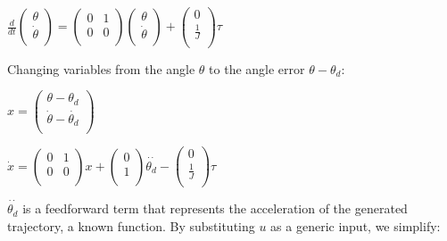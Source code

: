 \documentclass[11pt]{article}
\begin{document}
\begin{center}
\(\frac{d}{dt}\left(
\begin{array}{c}
 \theta  \\
 \dot{\theta } \\
\end{array}
\right)=\left(
\begin{array}{cc}
 0 & 1 \\
 0 & 0 \\
\end{array}
\right)\left(
\begin{array}{c}
 \theta  \\
 \dot{\theta } \\
\end{array}
\right)+\left(
\begin{array}{c}
 0 \\
 \frac{1}{J} \\
\end{array}
\right)\tau\)
\end{center}

Changing variables from the angle $\theta $ to the angle error \(\theta -\theta _d\):

\begin{center}
\(x=\left(
\begin{array}{c}
 \theta -\theta _d \\
 \dot{\theta }-\dot{\theta _d} \\
\end{array}
\right)\)

\(\dot{x}=\left(
\begin{array}{cc}
 0 & 1 \\
 0 & 0 \\
\end{array}
\right)x+\left(
\begin{array}{c}
 0 \\
 1 \\
\end{array}
\right)\overset{\cdot \cdot }{\theta _d}-\left(
\begin{array}{c}
 0 \\
 \frac{1}{J} \\
\end{array}
\right)\tau\)
\end{center}

\(\overset{\cdot \cdot }{\theta _d}\) is a feedforward term that represents the acceleration of the generated trajectory, a known function. By substituting
\(u\) as a generic input, we simplify:
\end{document}

